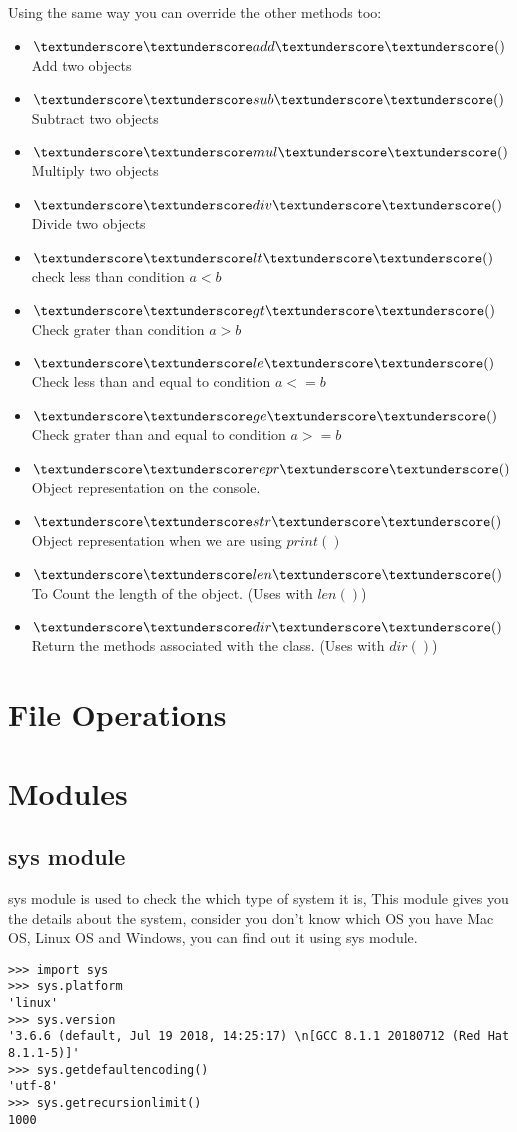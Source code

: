 \documentclass[letterpaper,12pt]{book}
\begin{document}
Using the same way you can override the other methods too:
\begin{itemize}
\item  $\textunderscore\textunderscore add \textunderscore\textunderscore()$ Add two objects
\item  $\textunderscore\textunderscore sub \textunderscore\textunderscore()$ Subtract two objects
\item  $\textunderscore\textunderscore mul \textunderscore\textunderscore()$ Multiply two objects
\item  $\textunderscore\textunderscore div \textunderscore\textunderscore()$ Divide two objects
\item  $\textunderscore\textunderscore lt \textunderscore\textunderscore()$ check less than condition $ a < b$
\item  $\textunderscore\textunderscore gt \textunderscore\textunderscore()$ Check grater than condition $ a > b$
\item  $\textunderscore\textunderscore le \textunderscore\textunderscore()$ Check less than and equal to condition $ a <= b$
\item  $\textunderscore\textunderscore ge \textunderscore\textunderscore()$ Check grater than and equal to condition $a >= b$
\item  $\textunderscore\textunderscore repr \textunderscore\textunderscore()$ Object representation on the console.
\item  $\textunderscore\textunderscore str \textunderscore\textunderscore()$ Object representation when we are using $print()$
\item  $\textunderscore\textunderscore len \textunderscore\textunderscore()$ To Count the length of the object. (Uses with $len()$)
\item  $\textunderscore\textunderscore dir \textunderscore\textunderscore()$ Return the methods associated with the class. (Uses with $dir()$)
\end{itemize}
\section{File Operations}
\section{Modules}
\subsection{sys module}
sys module is used to check the which type of system it is, This module gives you the details about the system, consider you don't know which OS you have Mac OS, Linux OS and Windows, you can find out it using sys module.
\begin{verbatim}
>>> import sys
>>> sys.platform
'linux'
>>> sys.version
'3.6.6 (default, Jul 19 2018, 14:25:17) \n[GCC 8.1.1 20180712 (Red Hat 8.1.1-5)]'
>>> sys.getdefaultencoding()
'utf-8'
>>> sys.getrecursionlimit()
1000
\end{verbatim}
\end{document}
